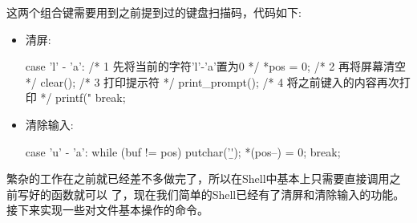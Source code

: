 这两个组合键需要用到之前提到过的键盘扫描码，代码如下:

\begin{itemize}
\item 清屏:
\begin{ccode}
	 case 'l' - 'a': 
	    /* 1 先将当前的字符'l'-'a'置为0 */
	    *pos = 0;
	    /* 2 再将屏幕清空 */
	    clear();
	    /* 3 打印提示符 */
	    print_prompt();
	    /* 4 将之前键入的内容再次打印 */
	    printf("%
	    break;
\end{ccode}
  
\item 清除输入:
\begin{ccode}
	 case 'u' - 'a':
	    while (buf != pos) {
	       putchar('\b');
	       *(pos--) = 0;
	    }
	    break;
\end{ccode}
\end{itemize}

繁杂的工作在之前就已经差不多做完了，所以在Shell中基本上只需要直接调用之前写好的函数就可以
了，现在我们简单的Shell已经有了清屏和清除输入的功能。接下来实现一些对文件基本操作的命令。


